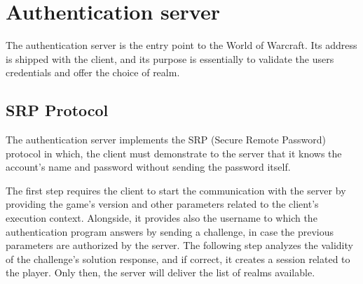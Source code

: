 \documentclass[paper=a4, fontsize=11pt]{scrartcl}
\begin{document}


\section{Authentication server}

The authentication server is the entry point to the World of Warcraft.  
Its address is shipped with the client, and its purpose is essentially to
validate the users credentials and offer the choice of realm.

\subsection{SRP Protocol}
The authentication server implements the SRP (Secure Remote Password) protocol 
in which, the client must demonstrate to the server that it knows the account's 
name and password without sending the password itself.

The first step requires the client to start the communication with the server
by providing the game's version and other parameters related to the client's
execution context. 
Alongside, it provides also the username to which the authentication program 
answers by sending a challenge, in case the previous parameters are 
authorized by the server. The following step analyzes the validity of the 
challenge's solution response, and if correct, it creates a session related to
the player.
Only then, the server will deliver the list of realms available.
\end{document}
